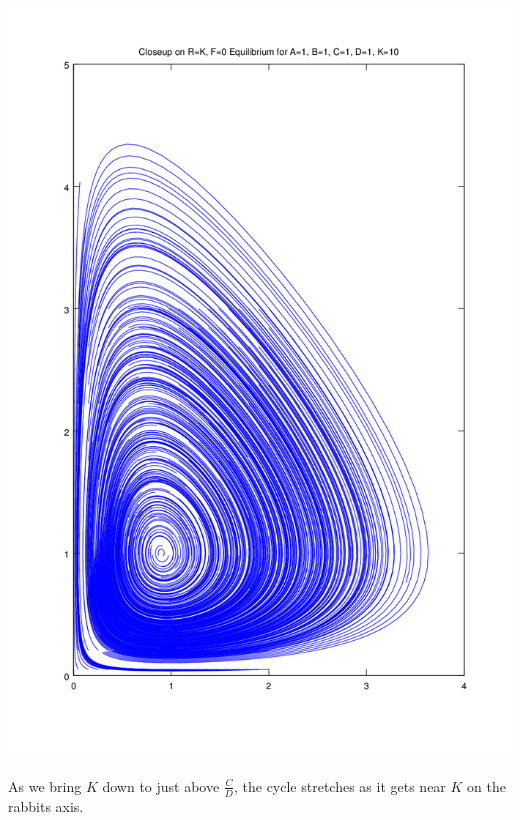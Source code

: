 \documentclass{article}
\begin{document}
\includegraphics[width=\textwidth]{plots/phase-potrait.png}

As we bring $K$ down to just above $\frac{C}{D}$,
	the cycle stretches as it gets near $K$ on the 
	rabbits axis.
\end{document}
